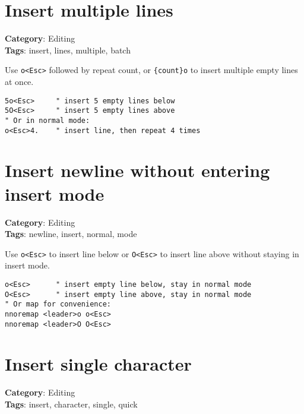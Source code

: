 {{{{{\section{Insert multiple lines}

\textbf{Category}: Editing\\ \textbf{Tags}: insert, lines, multiple, batch
\vspace{0.5cm}

Use {\footnotesize \Verb§o<Esc>§} followed by repeat count, or {\footnotesize \Verb§{count}o§} to insert multiple empty lines at once.

\begin{Exa*}{}
\begin{Verbatim}[fontsize=\footnotesize, breaklines, breakanywhere]
5o<Esc>     " insert 5 empty lines below
5O<Esc>     " insert 5 empty lines above
" Or in normal mode:
o<Esc>4.    " insert line, then repeat 4 times
\end{Verbatim}
\end{Exa*}

\section{Insert newline without entering insert mode}

\textbf{Category}: Editing\\ \textbf{Tags}: newline, insert, normal, mode
\vspace{0.5cm}

Use {\footnotesize \Verb§o<Esc>§} to insert line below or {\footnotesize \Verb§O<Esc>§} to insert line above without staying in insert mode.

\begin{Exa*}{}
\begin{Verbatim}[fontsize=\footnotesize, breaklines, breakanywhere]
o<Esc>      " insert empty line below, stay in normal mode
O<Esc>      " insert empty line above, stay in normal mode
" Or map for convenience:
nnoremap <leader>o o<Esc>
nnoremap <leader>O O<Esc>
\end{Verbatim}
\end{Exa*}

\section{Insert single character}

\textbf{Category}: Editing\\ \textbf{Tags}: insert, character, single, quick
\vspace{0.5cm}

}}}}}
